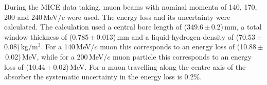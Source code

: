 During the MICE data taking, muon beams with nominal momenta of 140,
170, 200 and 240\,MeV/$c$ were used.
The energy loss and its uncertainty were calculated.
The calculation used a central bore length of
(349.6\,$\mathrm{\pm}$\,0.2)\,mm, a total window thickness of
(0.785\,$\mathrm{\pm}$\,0.013)\,mm and a liquid-hydrogen density of
\linebreak[4] (70.53\,$\mathrm{\pm}$\,0.08)\,kg/m$^{3}$.
For a 140\,MeV/$c$ muon this corresponds to an energy loss of
(10.88\,$\mathrm{\pm}$\,0.02)\,MeV, while for a 200\,MeV/$c$ muon 
particle this corresponds to an energy loss of
(10.44\,$\mathrm{\pm}$\,0.02)\,MeV.
For a muon travelling along the centre axis of the absorber the
systematic uncertainty in the energy loss is 0.2\%.
